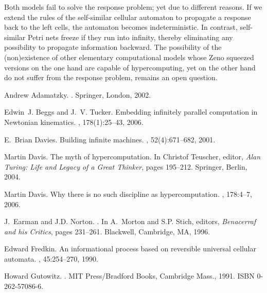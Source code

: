\documentclass{article}
\theoremstyle{definition}
\begin{document}
Both models fail to solve the response problem; yet due to different reasons.
If we extend the rules of the self-similar cellular automaton to propagate a response back to the left cells,
the automaton becomes indeterministic.
In contrast, self-similar Petri nets freeze if they run into infinity, thereby eliminating any possibility to
propagate information backward.
The possibility of the (non)existence of other elementary computational models whose Zeno squeezed versions  on the one hand are
capable of hypercomputing, yet on the other hand do not suffer from the response problem, remains an open question.

%
%


\begin{thebibliography}{Mur89}

Andrew Adamatzky.
.
\newblock Springer, London, 2002.

Edwin~J. Beggs and J.~V. Tucker.
\newblock Embedding infinitely parallel computation in Newtonian kinematics.
, 178(1):25--43, 2006.

E.~Brian Davies.
\newblock Building infinite machines.
,
  52(4):671--682, 2001.

Martin Davis.
\newblock The myth of hypercomputation.
\newblock In Christof Teuscher, editor, {\em Alan Turing: Life and Legacy of a
  Great Thinker}, pages 195--212. Springer, Berlin, 2004.

Martin Davis.
\newblock Why there is no such discipline as hypercomputation.
, 178:4--7, 2006.

J.~Earman and J.D. Norton.
.
\newblock In A.~Morton and S.P. Stich, editors, {\em {Benacerraf and his
  Critics}}, pages 231--261. Blackwell, Cambridge, MA, 1996.

Edward Fredkin.
\newblock An informational process based on reversible universal cellular
  automata.
, 45:254--270, 1990.

Howard Gutowitz.
.
\newblock MIT Press/Bradford Books, Cambridge Mass., 1991.
\newblock ISBN 0-262-57086-6.


\end{thebibliography}
\end{document}
